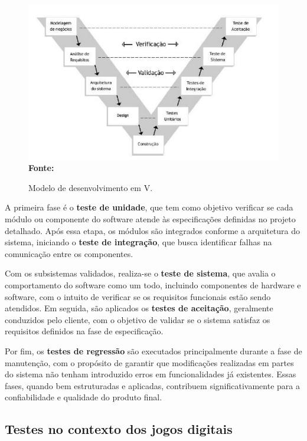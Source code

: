 \begin{figure}[H]
    \centering
    \caption{Modelo de desenvolvimento em V.}
    \vspace{0.5cm}
    \includegraphics[width=12cm]{images/v.png}
    \vspace{0.4cm}
    {\small \textbf{Fonte:} }
    \label{fig:v}
\end{figure}

A primeira fase é o \textbf{teste de unidade}, que tem como objetivo verificar se cada módulo ou componente do software atende às especificações definidas no projeto detalhado. Após essa etapa, os módulos são integrados conforme a arquitetura do sistema, iniciando o \textbf{teste de integração}, que busca identificar falhas na comunicação entre os componentes.

Com os subsistemas validados, realiza-se o \textbf{teste de sistema}, que avalia o comportamento do software como um todo, incluindo componentes de hardware e software, com o intuito de verificar se os requisitos funcionais estão sendo atendidos. Em seguida, são aplicados os \textbf{testes de aceitação}, geralmente conduzidos pelo cliente, com o objetivo de validar se o sistema satisfaz os requisitos definidos na fase de especificação.

Por fim, os \textbf{testes de regressão} são executados principalmente durante a fase de manutenção, com o propósito de garantir que modificações realizadas em partes do sistema não tenham introduzido erros em funcionalidades já existentes. Essas fases, quando bem estruturadas e aplicadas, contribuem significativamente para a confiabilidade e qualidade do produto final.

\subsection{Testes no contexto dos jogos digitais}

